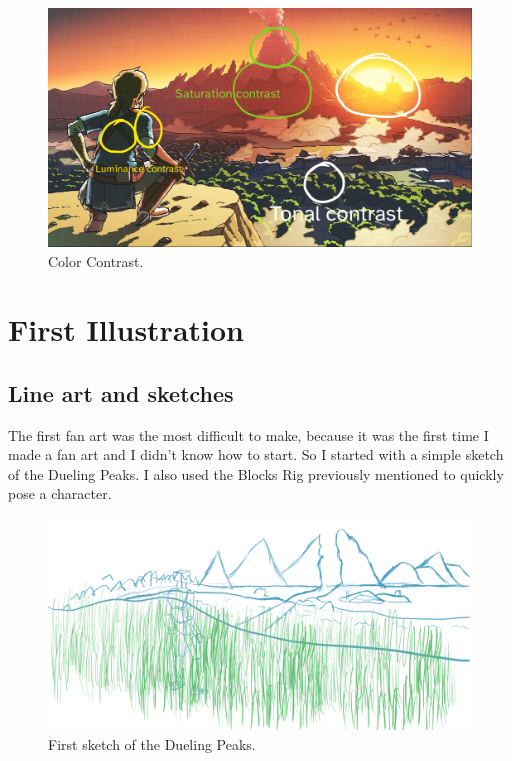 \documentclass{cup-pan}
\begin{document}
            \begin{figure}[H]
                \includegraphics[width=\textwidth]{Imagenes/Referencias/Analisis_ConceptArt/contrast.png}
                \caption{Color Contrast.}
            \end{figure}


\newpage
\section{First Illustration}
    \subsection{Line art and sketches}

        The first fan art was the most difficult to make, because it was the first time I made a fan art and I didn't know how to start. So I started with a simple sketch of the Dueling Peaks. 
        I also used the Blocks Rig previously mentioned to quickly pose a character.\\
        \begin{figure}[H]
            \includegraphics[width=\textwidth]{Imagenes/Fanart1/Boceto_Lineart/0 Imagen de partida.png}
            \caption{First sketch of the Dueling Peaks.}
        \end{figure}
\end{document}
